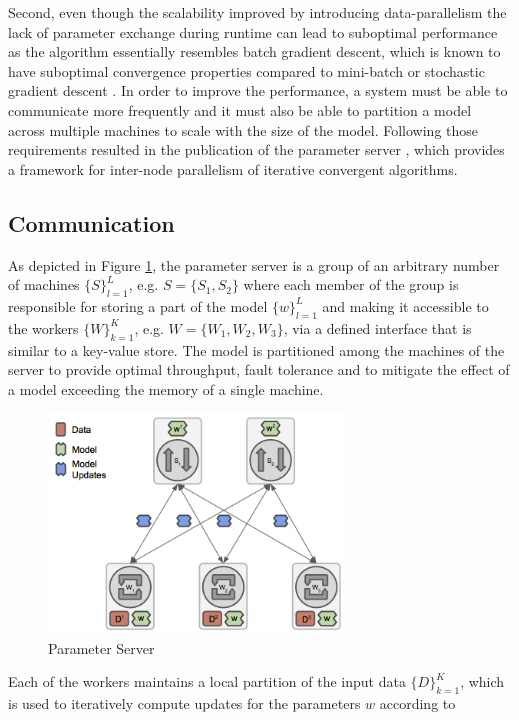 Second, even though the scalability improved by introducing data-parallelism the lack of parameter exchange during runtime can lead to suboptimal performance \cite{xing2015strategies} as the algorithm essentially resembles batch gradient descent, which is known to have suboptimal convergence properties compared to mini-batch or stochastic gradient descent \cite{bottou2010large} \cite{smith2016cocoa}.
In order to improve the performance, a system must be able to communicate more frequently and it must also be able to partition a model across multiple machines to scale with the size of the model.
Following those requirements resulted in the publication of the parameter server \cite{Li2014}, which provides a framework for inter-node parallelism of iterative convergent algorithms.

\subsection{Communication}
As depicted in Figure \ref{fig:param_server}, the parameter server is a group of an arbitrary number of machines $\{S\}_{l=1}^L$, e.g. $S = \{S_1, S_2\}$ where each member of the group is responsible for storing a part of the model $\{w\}_{l=1}^L$ and making it accessible to the workers $\{W\}_{k=1}^K$, e.g. $W = \{W_1, W_2, W_3\}$, via a defined interface that is similar to a key-value store.
The model is partitioned among the machines of the server to provide optimal throughput, fault tolerance and to mitigate the effect of a model exceeding the memory of a single machine.
\begin{figure}[ht]
\centering
\includegraphics[width=0.7\textwidth]{img/param_server.png}
\caption{Parameter Server}
\label{fig:param_server}
\end{figure}
Each of the workers maintains a local partition of the input data $\{D\}_{k=1}^K$, which is used to iteratively compute updates for the parameters $w$ according to
